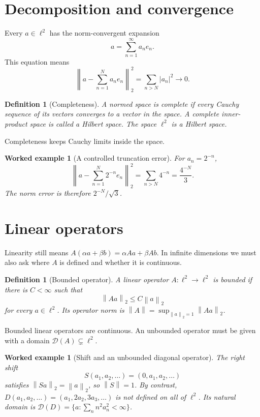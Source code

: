 \documentclass[11pt,a5paper,oneside,openany]{scrreprt}
\theoremstyle{notes}
\theoremstyle{definitions}
\newtheorem{definition}[theorem]{Definition}
\newtheorem{example}[theorem]{Worked example}
\newcommand{\norm}[1]{\left\lVert #1\right\rVert}
\begin{document}
\section{Decomposition and convergence}

Every $a\in\ell^2$ has the norm-convergent expansion
\[
  \boxed{a=\sum_{n=1}^{\infty}a_ne_n}.
\]
This equation means
\[
 \norm{a-\sum_{n=1}^{N}a_ne_n}_2^2
 =\sum_{n>N}|a_n|^2\longrightarrow0.
\]

\begin{definition}[Completeness]
A normed space is complete if every Cauchy sequence of its vectors converges
to a vector in the space.  A complete inner-product space is called a Hilbert
space.  The space $\ell^2$ is a Hilbert space.
\end{definition}

Completeness keeps Cauchy limits inside the space.

\begin{example}[A controlled truncation error]
For $a_n=2^{-n}$,
\[
 \norm{a-\sum_{n=1}^{N}2^{-n}e_n}_2^2
 =\sum_{n>N}4^{-n}=\frac{4^{-N}}{3}.
\]
The norm error is therefore $2^{-N}/\sqrt3$.
\end{example}

\section{Linear operators}

Linearity still means $A(\alpha a+\beta b)=\alpha Aa+\beta Ab$.  In infinite
dimensions we must also ask where $A$ is defined and whether it is continuous.

\begin{definition}[Bounded operator]
A linear operator $A:\ell^2\to\ell^2$ is bounded if there is $C<\infty$ such
that
\[
 \norm{Aa}_2\le C\norm{a}_2
\]
for every $a\in\ell^2$.  Its operator norm is
$\norm{A}=\sup_{\norm{a}_2=1}\norm{Aa}_2$.
\end{definition}

Bounded linear operators are continuous.  An unbounded operator must be given
with a domain $\mathcal D(A)\subsetneq\ell^2$.

\begin{example}[Shift and an unbounded diagonal operator]
The right shift
\[
 S(a_1,a_2,\ldots)=(0,a_1,a_2,\ldots)
\]
satisfies $\norm{Sa}_2=\norm{a}_2$, so $\norm{S}=1$.  By contrast,
$D(a_1,a_2,\ldots)=(a_1,2a_2,3a_3,\ldots)$ is not defined on all of $\ell^2$.
Its natural domain is
$\mathcal D(D)=\{a:\sum_n n^2a_n^2<\infty\}$.
\end{example}
\end{document}
